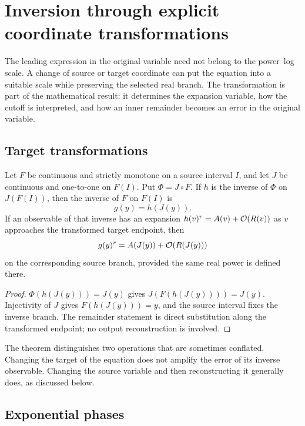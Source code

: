 \section{Inversion through explicit coordinate transformations}
\label{sec:coordinates}

The leading expression in the original variable need not belong to the power--log scale. A change of source or target coordinate can put the equation into a suitable scale while preserving the selected real branch. The transformation is part of the mathematical result: it determines the expansion variable, how the cutoff is interpreted, and how an inner remainder becomes an error in the original variable.

\subsection{Target transformations}

\begin{theorem}
\label{thm:target-coordinate}
Let $F$ be continuous and strictly monotone on a source interval $I$, and let $J$ be continuous and one-to-one on $F(I)$. Put $\Phi=J\circ F$. If $h$ is the inverse of $\Phi$ on $J(F(I))$, then the inverse of $F$ on $F(I)$ is
\[
 g(y)=h(J(y)).
\]
If an observable of that inverse has an expansion $h(v)^r=A(v)+\mathcal O(R(v))$ as $v$ approaches the transformed target endpoint, then
\[
 g(y)^r=A(J(y))+\mathcal O(R(J(y)))
\]
on the corresponding source branch, provided the same real power is defined there.
\end{theorem}
\begin{proof}
$\Phi(h(J(y)))=J(y)$ gives $J(F(h(J(y))))=J(y)$. Injectivity of $J$ gives $F(h(J(y)))=y$, and the source interval fixes the inverse branch. The remainder statement is direct substitution along the transformed endpoint; no output reconstruction is involved.
\end{proof}

The theorem distinguishes two operations that are sometimes conflated. Changing the target of the equation does not amplify the error of its inverse observable. Changing the source variable and then reconstructing it generally does, as discussed below.

\subsection{Exponential phases}

